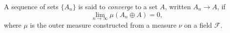 A sequence of sets $\{A_n\}$ is said to \textit{converge} to a set $A$, written $A_n \to A$, if
$$\lim_{n \to \infty} \mu(A_n \oplus A) = 0,$$
where $\mu$ is the outer measure constructed from a measure $\nu$ on a field $\mathcal{F}$.
